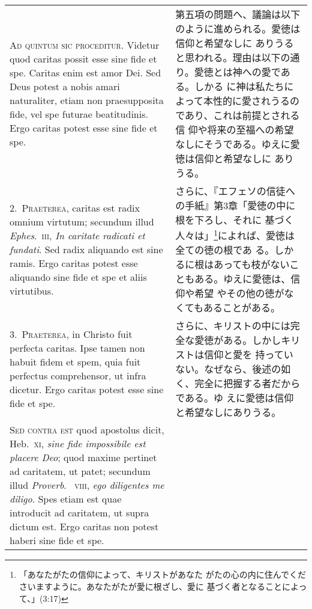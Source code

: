 \documentclass[10pt]{jsarticle}
\begin{document}
\begin{longtable}{p{21em}p{21em}}

{\scshape Ad quintum sic proceditur}. Videtur quod caritas possit esse
sine fide et spe. Caritas enim est amor Dei. Sed Deus potest a nobis
amari naturaliter, etiam non praesupposita fide, vel spe futurae
beatitudinis. Ergo caritas potest esse sine fide et spe.

&

 第五項の問題へ、議論は以下のように進められる。愛徳は信仰と希望なしに
 ありうると思われる。理由は以下の通り。愛徳とは神への愛である。しかる
 に神は私たちによって本性的に愛されうるのであり、これは前提とされる信
 仰や将来の至福への希望なしにそうである。ゆえに愛徳は信仰と希望なしに
 ありうる。
 

\\

2.~{\scshape Praeterea}, caritas est radix omnium virtutum; secundum
illud {\itshape Ephes}.~{\scshape iii}, {\itshape In caritate radicati
et fundati}. Sed radix aliquando est sine ramis. Ergo caritas potest
esse aliquando sine fide et spe et aliis virtutibus.


&

 さらに、『エフェソの信徒への手紙』第3章「愛徳の中に根を下ろし、それに
 基づく人々は」\footnote{「あなたがたの信仰によって、キリストがあなた
 がたの心の内に住んでくださいますように。あなたがたが愛に根ざし、愛に
 基づく者となることによって、」(3:17)}によれば、愛徳は全ての徳の根であ
 る。しかるに根はあっても枝がないこともある。ゆえに愛徳は、信仰や希望
 やその他の徳がなくてもあることがある。

\\


3.~{\scshape Praeterea}, in Christo fuit perfecta caritas. Ipse tamen
non habuit fidem et spem, quia fuit perfectus comprehensor, ut infra
dicetur. Ergo caritas potest esse sine fide et spe.

&

 さらに、キリストの中には完全な愛徳がある。しかしキリストは信仰と愛を
 持っていない。なぜなら、後述の如く、完全に把握する者だからである。ゆ
 えに愛徳は信仰と希望なしにありうる。

\\


{\scshape Sed contra est} quod apostolus dicit, Heb.~{\scshape xi},
{\itshape sine fide impossibile est placere Deo}; quod maxime pertinet
ad caritatem, ut patet; secundum illud {\itshape Proverb}.~{\scshape
viii}, {\itshape ego diligentes me diligo}. Spes etiam est quae
introducit ad caritatem, ut supra dictum est. Ergo caritas non potest
haberi sine fide et spe.



\end{longtable}
\end{document}
